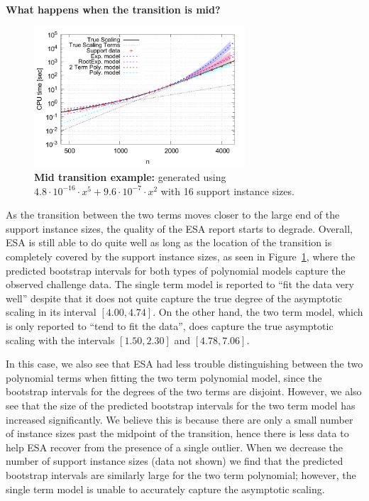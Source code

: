 \documentclass[aic]{iosart2x}
\begin{document}
\textbf{What happens when the transition is mid?}
\begin{figure}[t]
\centering
\includegraphics[width=0.7\textwidth]{fittedModels-2-5-15-16s.pdf}
\caption{\textbf{Mid transition example:} generated using $4.8\cdot 10^{-16} \cdot x^5 + 9.6\cdot 10^{-7} \cdot x^2$ with 16 support instance sizes.}
\label{fig:AA-competing-2-5-15-16s}
\end{figure}
As the transition between the two terms moves closer to the large end of the support instance sizes, the quality of the ESA report starts to degrade. Overall, ESA is still able to do quite well as long as the location of the transition is completely covered by the support instance sizes, as seen in Figure~\ref{fig:AA-competing-2-5-15-16s}, where the predicted bootstrap intervals for both types of polynomial models capture the observed challenge data. The single term model is reported to ``fit the data very well'' despite that it does not quite capture the true degree of the asymptotic scaling in its interval $[4.00,4.74]$. On the other hand, the two term model, which is only reported to ``tend to fit the data'', does capture the true asymptotic scaling with the intervals $[1.50,2.30]$ and $[4.78,7.06]$. 

In this case, we also see that ESA had less trouble distinguishing between the two polynomial terms when fitting the two term polynomial model, since the bootstrap intervals for the degrees of the two terms are disjoint. However, we also see that the size of the predicted bootstrap intervals for the two term model has increased significantly. We believe this is because there are only a small number of instance sizes past the midpoint of the transition, hence there is less data to help ESA recover from the presence of a single outlier. When we decrease the number of support instance sizes (data not shown) we find that the predicted bootstrap intervals are similarly large for the two term polynomial; however, the single term model is unable to accurately capture the asymptotic scaling.
\end{document}
